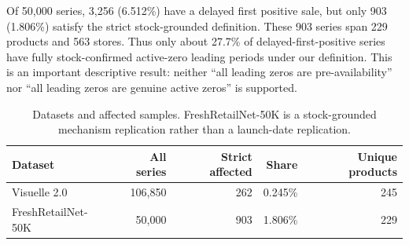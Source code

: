 Of 50,000 series, 3,256 (6.512\%) have a delayed first positive sale, but only 903 (1.806\%) satisfy the strict stock-grounded definition. These 903 series span 229 products and 563 stores. Thus only about 27.7\% of delayed-first-positive series have fully stock-confirmed active-zero leading periods under our definition. This is an important descriptive result: neither ``all leading zeros are pre-availability'' nor ``all leading zeros are genuine active zeros'' is supported.

\begin{table}[t]
\centering
\caption{Datasets and affected samples. FreshRetailNet-50K is a stock-grounded mechanism replication rather than a launch-date replication.}
\label{tab:data}
\small
\begin{tabular}{lrrrr}
\toprule
Dataset & All series & Strict affected & Share & Unique products \\
\midrule
Visuelle 2.0 & 106,850 & 262 & 0.245\% & 245 \\
FreshRetailNet-50K & 50,000 & 903 & 1.806\% & 229 \\
\bottomrule
\end{tabular}
\end{table}
